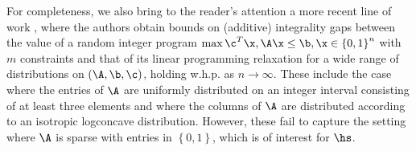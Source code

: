 \noindent
For completeness, we also bring to the reader’s attention a more recent line of work \cite{borst2022gaussian, borst2022integrality}, 
where the authors obtain bounds on (additive) integrality gaps between the value of a random integer program $\max \c^T \x, \A\x \leq \b, \x \in \left\{0,1\right\}^n$ with $m$ constraints and that of its linear programming relaxation for a wide range of distributions on $(\A,\b,\c)$, holding w.h.p. as $n\rightarrow \infty$. These include the case where the entries of $\A$ are uniformly distributed on an integer interval consisting of at least three elements and where the columns of $\A$ are distributed according to an isotropic logconcave distribution. However, these fail to capture the setting where $\A$ is sparse with entries in $\left\{0,1\right\}$, which is of interest for $\hs$.

